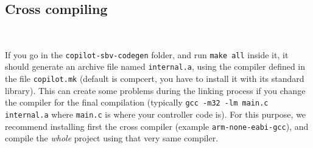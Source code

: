 \subsection{Cross compiling}~\label{sec:cross}

If you go in the \texttt{copilot-sbv-codegen} folder, and run {\tt make all}
inside it, it should generate an archive file named \texttt{internal.a}, using
the compiler defined in the file \texttt{copilot.mk} (default is compcert, you
have to install it with its standard library). This can create some problems
during the linking process if you change the compiler for the final compilation
(typically \texttt{gcc -m32 -lm main.c internal.a} where \texttt{main.c} is
where your controller code is). For this purpose, we recommend installing first
the cross compiler (example \texttt{arm-none-eabi-gcc}), and compile the
\emph{whole} project using that very same compiler.
